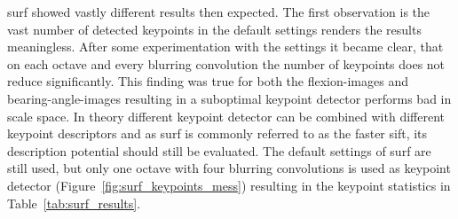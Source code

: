 \acrshort{surf} showed vastly different results then expected.
The first observation is the vast number of detected keypoints in the default settings renders the results meaningless.
After some experimentation with the settings it became clear, that on each octave and every blurring convolution the number of keypoints does not reduce significantly.
This finding was true for both the \glspl{flexion-image} and \glspl{bearing-angle-image} resulting in a suboptimal keypoint detector performs bad in scale space.
In theory different keypoint detector can be combined with different keypoint descriptors and as \acrshort{surf} is commonly referred to as the faster \acrshort{sift}, its description potential should still be evaluated.
The default settings of \acrshort{surf} are still used, but only one octave with four blurring convolutions is used as keypoint detector (Figure~\ref{fig:surf_keypoints_mess}) resulting in the keypoint statistics in Table~\ref{tab:surf_results}.
